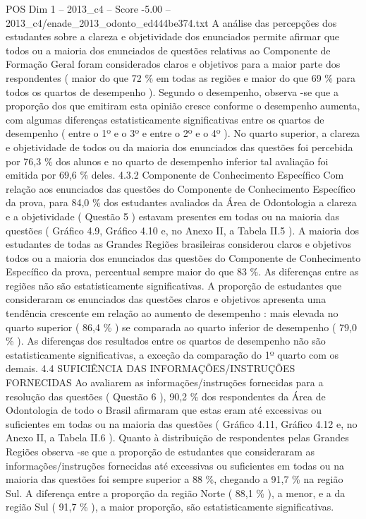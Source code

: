 \begin{textsample}{POS Dim 1 – 2013\_c4 – Score -5.00 – 2013\_c4/enade\_2013\_odonto\_ed444be374.txt}
A análise das percepções dos estudantes sobre a clareza e objetividade dos enunciados permite afirmar que todos ou a maioria dos enunciados de questões relativas ao Componente de Formação Geral foram considerados claros e objetivos para a maior parte dos respondentes ( maior do que 72 \% em todas as regiões e maior do que 69 \% para todos os quartos de desempenho ).
Segundo o desempenho, observa -se que a proporção dos que emitiram esta opinião cresce conforme o desempenho aumenta, com algumas diferenças estatisticamente significativas entre os quartos de desempenho ( entre o 1º e o 3º e entre o 2º e o 4º ).
No quarto superior, a clareza e objetividade de todos ou da maioria dos enunciados das questões foi percebida por 76,3 \% dos alunos e no quarto de desempenho inferior tal avaliação foi emitida por 69,6 \% deles. 4.3.2 Componente de Conhecimento Específico Com relação aos enunciados das questões do Componente de Conhecimento Específico da prova, para 84,0 \% dos estudantes avaliados da Área de Odontologia a clareza e a objetividade ( Questão 5 ) estavam presentes em todas ou na maioria das questões ( Gráfico 4.9, Gráfico 4.10 e, no Anexo II, a Tabela II.5 ).
A maioria dos estudantes de todas as Grandes Regiões brasileiras considerou claros e objetivos todos ou a maioria dos enunciados das questões do Componente de Conhecimento Específico da prova, percentual sempre maior do que 83 \%.
As diferenças entre as regiões não são estatisticamente significativas.
A proporção de estudantes que consideraram os enunciados das questões claros e objetivos apresenta uma tendência crescente em relação ao aumento de desempenho : mais elevada no quarto superior ( 86,4 \% ) se comparada ao quarto inferior de desempenho ( 79,0 \% ).
As diferenças dos resultados entre os quartos de desempenho não são estatisticamente significativas, a exceção da comparação do 1º quarto com os demais. 4.4 SUFICIÊNCIA DAS INFORMAÇÕES/INSTRUÇÕES FORNECIDAS Ao avaliarem as informações/instruções fornecidas para a resolução das questões ( Questão 6 ), 90,2 \% dos respondentes da Área de Odontologia de todo o Brasil afirmaram que estas eram até excessivas ou suficientes em todas ou na maioria das questões ( Gráfico 4.11, Gráfico 4.12 e, no Anexo II, a Tabela II.6 ).
Quanto à distribuição de respondentes pelas Grandes Regiões observa -se que a proporção de estudantes que consideraram as informações/instruções fornecidas até excessivas ou suficientes em todas ou na maioria das questões foi sempre superior a 88 \%, chegando a 91,7 \% na região Sul.
A diferença entre a proporção da região Norte ( 88,1 \% ), a menor, e a da região Sul ( 91,7 \% ), a maior proporção, são estatisticamente significativas.

\end{textsample}

